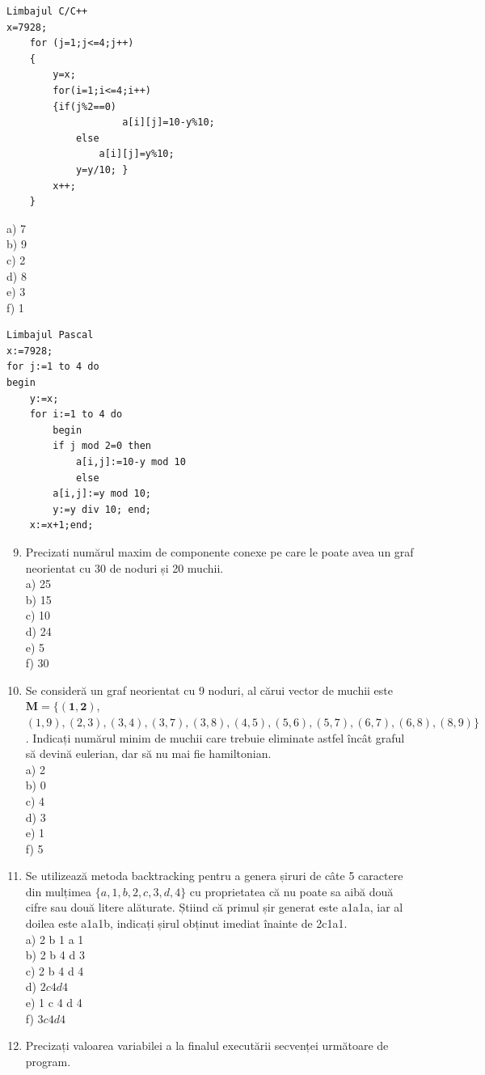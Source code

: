 \documentclass[10pt]{article}
\begin{document}
\begin{verbatim}
Limbajul C/C++
x=7928;
    for (j=1;j<=4;j++)
    {
        y=x;
        for(i=1;i<=4;i++)
        {if(j%2==0)
                    a[i][j]=10-y%10;
            else
                a[i][j]=y%10;
            y=y/10; }
        x++;
    }
\end{verbatim}

a) 7\\
b) 9\\
c) 2\\
d) 8\\
e) 3\\
f) 1

\begin{verbatim}
Limbajul Pascal
x:=7928;
for j:=1 to 4 do
begin
    y:=x;
    for i:=1 to 4 do
        begin
        if j mod 2=0 then
            a[i,j]:=10-y mod 10
            else
        a[i,j]:=y mod 10;
        y:=y div 10; end;
    x:=x+1;end;
\end{verbatim}

\begin{enumerate}
  \setcounter{enumi}{8}
  \item Precizati numărul maxim de componente conexe pe care le poate avea un graf neorientat cu 30 de noduri și 20 muchii.\\
a) 25\\
b) 15\\
c) 10\\
d) 24\\
e) 5\\
f) 30
  \item Se consideră un graf neorientat cu 9 noduri, al cărui vector de muchii este $\mathbf{M}=\{(\mathbf{1 , 2})$, $(1,9),(2,3),(3,4),(3,7),(3,8),(4,5),(5,6),(5,7),(6,7),(6,8),(8,9)\}$. Indicați numărul minim de muchii care trebuie eliminate astfel încât graful să devină eulerian, dar să nu mai fie hamiltonian.\\
a) 2\\
b) 0\\
c) 4\\
d) 3\\
e) 1\\
f) 5
  \item Se utilizează metoda backtracking pentru a genera șiruri de câte 5 caractere din mulțimea $\{a, 1, b, 2, c, 3, d, 4\}$ cu proprietatea că nu poate sa aibă două cifre sau două litere alăturate. Știind că primul șir generat este a1a1a, iar al doilea este a1a1b, indicați șirul obținut imediat înainte de 2c1a1.\\
a) 2 b 1 a 1\\
b) 2 b 4 d 3\\
c) 2 b 4 d 4\\
d) $2 c 4 d 4$\\
e) 1 c 4 d 4\\
f) $3 c 4 d 4$
  \item Precizați valoarea variabilei a la finalul executării secvenței următoare de program.
\end{enumerate}
\end{document}
